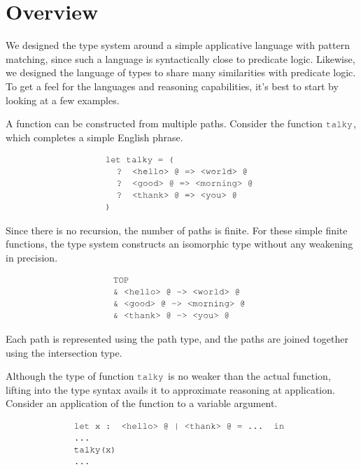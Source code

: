 \documentclass[acmsmall]{acmart}
\theoremstyle{definition}
\begin{document}
\section{Overview}
\label{sec:overview}
We designed the type system around a simple applicative language with pattern matching,
since such a language is syntactically close to predicate logic. Likewise,
we designed the language of types to share many similarities with predicate logic. 
To get a feel for the languages and reasoning capabilities, it's best to start by
looking at a few examples.


A function can be constructed from multiple paths. 
Consider the function $\J{talky}$, which completes a simple English phrase.

\[
  \begin{array}[t]{@{} l}
    \J{let talky = (}
      \\
      \I \J{? <hello> @ => <world> @}
      \\
      \I \J{? <good> @ => <morning> @} 
      \\
      \I \J{? <thank> @ => <you> @} 
      \\
    \J{)}
  \end{array}
\]

\noindent
Since there is no recursion, the number of paths is finite.
For these simple finite functions, the type system constructs
an isomorphic type without any weakening in precision. 

\[
  \begin{array}[t]{@{} l}
    \J{TOP}
      \\
      \J{\& <hello> @ -> <world> @}
      \\
      \J{\& <good> @ -> <morning> @} 
      \\
      \J{\& <thank> @ -> <you> @} 
  \end{array}
\]

\noindent
Each path is represented using the path type,
and the paths are joined together using the intersection type.

Although the type of function $\J{talky}$ is no weaker than the actual function,
lifting into the type syntax avails it to approximate reasoning at application.
Consider an application of the function to a variable argument. 

\[
  \begin{array}[t]{@{} l}
    \J{let x : <hello> @ | <thank> @ = ... in}
    \\
    \J{...}
    \\
    \J{talky(x)} 
    \\
    \J{...}
  \end{array}
\]
\end{document}
